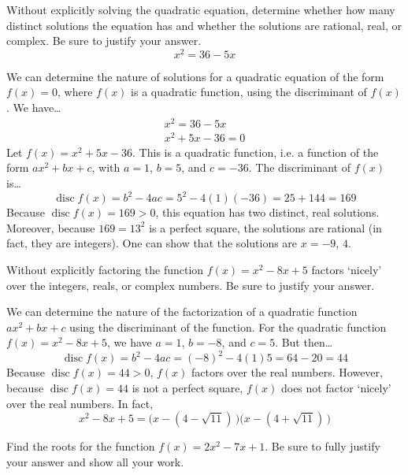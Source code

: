 \documentclass[11pt,letterpaper]{article}
\DeclareMathOperator{\disc}{disc}
\begin{document}

 Without explicitly solving the quadratic equation, determine whether how many distinct solutions the equation has and whether the solutions are rational, real, or complex. Be sure to justify your answer.
	\[
	x^2= 36 - 5x
	\] \pspace

\sol We can determine the nature of solutions for a quadratic equation of the form $f(x)= 0$, where $f(x)$ is a quadratic function, using the discriminant of $f(x)$. We have\dots
	\[
	\begin{gathered}
	x^2= 36 - 5x \\
	x^2 + 5x - 36= 0
	\end{gathered}
	\]
Let $f(x)= x^2 + 5x - 36$. This is a quadratic function, i.e. a function of the form $ax^2 + bx + c$, with $a= 1$, $b= 5$, and $c= -36$. The discriminant of $f(x)$ is\dots
	\[
	\disc f(x)= b^2 - 4ac= 5^2 - 4(1)(-36)= 25 + 144= 169
	\]
Because $\disc f(x)= 169 > 0$, this equation has two distinct, real solutions. Moreover, because $169= 13^2$ is a perfect square, the solutions are rational (in fact, they are integers). One can show that the solutions are $x= -9$, $4$. 



\newpage



 Without explicitly factoring the function $f(x)= x^2 - 8x + 5$ factors `nicely' over the integers, reals, or complex numbers. Be sure to justify your answer. \pspace

\sol We can determine the nature of the factorization of a quadratic function $ax^2 + bx + c$ using the discriminant of the function. For the quadratic function $f(x)= x^2 - 8x + 5$, we have $a= 1$, $b= -8$, and $c= 5$. But then\dots
	\[
	\disc f(x)= b^2 - 4ac= (-8)^2 - 4(1)5= 64 - 20= 44
	\]
Because $\disc f(x)= 44 > 0$, $f(x)$ factors over the real numbers. However, because $\disc f(x)= 44$ is not a perfect square, $f(x)$ does not factor `nicely' over the real numbers. In fact, 
	\[
	x^2 - 8x + 5= \big(x - (4 - \sqrt{11})\, \big) \big(x - (4 + \sqrt{11})\, \big)
	\]



\newpage



 Find the roots for the function $f(x)= 2x^2 - 7x + 1$. Be sure to fully justify your answer and show all your work. \pspace
\end{document}
